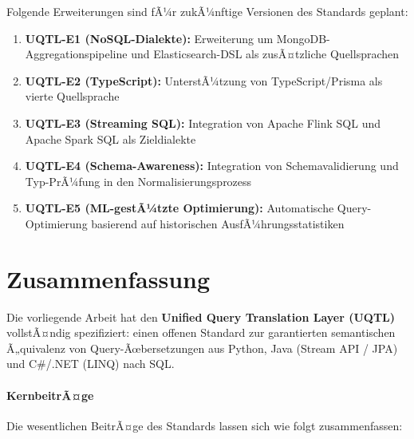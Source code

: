 Folgende Erweiterungen sind fÃ¼r zukÃ¼nftige Versionen des Standards geplant:

\begin{enumerate}[leftmargin=1.5cm]
  \item \textbf{UQTL-E1 (NoSQL-Dialekte):} Erweiterung um MongoDB-Aggregations\-pipeline
    und Elasticsearch-DSL als zusÃ¤tzliche Quellsprachen
  \item \textbf{UQTL-E2 (TypeScript):} UnterstÃ¼tzung von TypeScript/Prisma als
    vierte Quellsprache
  \item \textbf{UQTL-E3 (Streaming SQL):} Integration von Apache Flink SQL und
    Apache Spark SQL als Zieldialekte
  \item \textbf{UQTL-E4 (Schema-Awareness):} Integration von Schemavalidierung
    und Typ-PrÃ¼fung in den Normalisierungsprozess
  \item \textbf{UQTL-E5 (ML-gestÃ¼tzte Optimierung):} Automatische Query-Optimierung
    basierend auf historischen AusfÃ¼hrungsstatistiken
\end{enumerate}

\section{Zusammenfassung}
\label{sec:zusammenfassung}

Die vorliegende Arbeit hat den \textbf{Unified Query Translation Layer (UQTL)}
vollstÃ¤ndig spezifiziert: einen offenen Standard zur garantierten semantischen
Ã„quivalenz von Query-Ãœbersetzungen aus Python, Java (Stream API / JPA) und
C\#/.NET (LINQ) nach SQL.

\paragraph{KernbeitrÃ¤ge}
Die wesentlichen BeitrÃ¤ge des Standards lassen sich wie folgt zusammenfassen:

